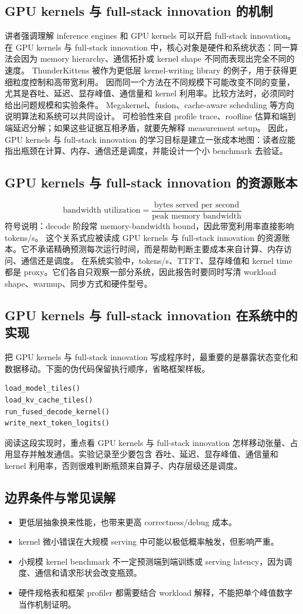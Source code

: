 \documentclass[a4paper]{article}
\begin{document}
\subsection{GPU kernels 与 full-stack innovation 的机制}
讲者强调理解 inference engines 和 GPU kernels 可以开启 full-stack innovation。 在 GPU kernels 与 full-stack innovation 中，核心对象是硬件和系统状态：同一算法会因为 memory hierarchy、通信拓扑或 kernel shape 不同而表现出完全不同的速度。
ThunderKittens 被作为更低层 kernel-writing library 的例子，用于获得更细粒度控制和高带宽利用。 因而同一个方法在不同规模下可能改变不同的变量，尤其是吞吐、延迟、显存峰值、通信量和 kernel 利用率。比较方法时，必须同时给出问题规模和实验条件。
Megakernel、fusion、cache-aware scheduling 等方向说明算法和系统可以共同设计。 可检验性来自 profile trace、roofline 估算和端到端延迟分解；如果这些证据互相矛盾，就要先解释 measurement setup。
因此，GPU kernels 与 full-stack innovation 的学习目标是建立一张成本地图：读者应能指出瓶颈在计算、内存、通信还是调度，并能设计一个小 benchmark 去验证。
\subsection{GPU kernels 与 full-stack innovation 的资源账本}
\[\text{bandwidth utilization}=\frac{\text{bytes served per second}}{\text{peak memory bandwidth}}\]
符号说明：decode 阶段常 memory-bandwidth bound，因此带宽利用率直接影响 tokens/s。
这个关系式应被读成 GPU kernels 与 full-stack innovation 的资源账本。它不承诺精确预测每次运行时间，而是帮助判断主要成本来自计算、内存访问、通信还是调度。
在系统实验中，tokens/s、TTFT、显存峰值和 kernel time 都是 proxy。它们各自只观察一部分系统，因此报告时要同时写清 workload shape、warmup、同步方式和硬件型号。
\subsection{GPU kernels 与 full-stack innovation 在系统中的实现}
把 GPU kernels 与 full-stack innovation 写成程序时，最重要的是暴露状态变化和数据移动。下面的伪代码保留执行顺序，省略框架样板。
\begin{lstlisting}[language=Python]
load_model_tiles()
load_kv_cache_tiles()
run_fused_decode_kernel()
write_next_token_logits()
\end{lstlisting}
阅读这段实现时，重点看 GPU kernels 与 full-stack innovation 怎样移动张量、占用显存并触发通信。实验记录至少要包含 吞吐、延迟、显存峰值、通信量和 kernel 利用率，否则很难判断瓶颈来自算子、内存层级还是调度。
\subsection{边界条件与常见误解}
\begin{itemize}
\item 更低层抽象换来性能，也带来更高 correctness/debug 成本。
\item kernel 微小错误在大规模 serving 中可能以极低概率触发，但影响严重。
\item 小规模 kernel benchmark 不一定预测端到端训练或 serving latency，因为调度、通信和请求形状会改变瓶颈。
\item 硬件规格表和框架 profiler 都需要结合 workload 解释，不能把单个峰值数字当作机制证明。
\end{itemize}
\end{document}
